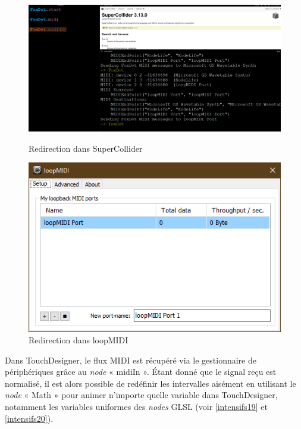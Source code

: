 \begin{figure}[h]
  \begin{minipage}[b]{0.45\linewidth}
    \centering
    \includegraphics[width=\linewidth]{images/experiments/intensifs/intensifs03.png}
    \caption{Redirection dans SuperCollider}
    \label{intensifs03}
  \end{minipage}
  \hspace{0.1\linewidth} %
  \begin{minipage}[b]{0.45\linewidth}
    \centering
    \includegraphics[width=\linewidth]{images/experiments/loopmidi00.PNG}
    \caption{Redirection dans loopMIDI}
    \label{loopmidi00}
  \end{minipage}
\end{figure}

Dans TouchDesigner, le flux MIDI est récupéré via le gestionnaire de périphériques grâce au \textit{node} « midiIn ». Étant donné que le signal reçu est normalisé, il est alors possible de redéfinir les intervalles aisément en utilisant le \textit{node} « Math » pour animer n'importe quelle variable dans TouchDesigner, notamment les variables uniformes des \textit{nodes} GLSL (voir \ref{intensifs19} et \ref{intensifs20}).

